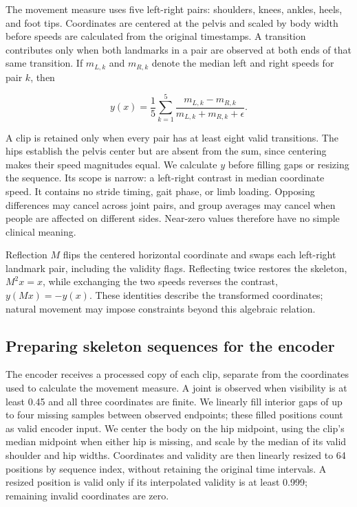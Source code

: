 \documentclass{article}
\begin{document}
The movement measure uses five left-right pairs: shoulders, knees, ankles, heels, and foot tips. Coordinates are centered at the pelvis and scaled by body width before speeds are calculated from the original timestamps. A transition contributes only when both landmarks in a pair are observed at both ends of that same transition. If \(m_{L,k}\) and \(m_{R,k}\) denote the median left and right speeds for pair \(k\), then

\[
y(x)=\frac{1}{5}\sum_{k=1}^{5}
\frac{m_{L,k}-m_{R,k}}{m_{L,k}+m_{R,k}+\epsilon}.
\]

A clip is retained only when every pair has at least eight valid transitions. The hips establish the pelvis center but are absent from the sum, since centering makes their speed magnitudes equal. We calculate \(y\) before filling gaps or resizing the sequence. Its scope is narrow: a left-right contrast in median coordinate speed. It contains no stride timing, gait phase, or limb loading. Opposing differences may cancel across joint pairs, and group averages may cancel when people are affected on different sides. Near-zero values therefore have no simple clinical meaning.

Reflection \(M\) flips the centered horizontal coordinate and swaps each left-right landmark pair, including the validity flags. Reflecting twice restores the skeleton, \(M^2x=x\), while exchanging the two speeds reverses the contrast, \(y(Mx)=-y(x)\). These identities describe the transformed coordinates; natural movement may impose constraints beyond this algebraic relation.

\subsection{Preparing skeleton sequences for the encoder}\label{preparing-skeleton-sequences-for-the-encoder}

The encoder receives a processed copy of each clip, separate from the coordinates used to calculate the movement measure. A joint is observed when visibility is at least 0.45 and all three coordinates are finite. We linearly fill interior gaps of up to four missing samples between observed endpoints; these filled positions count as valid encoder input. We center the body on the hip midpoint, using the clip's median midpoint when either hip is missing, and scale by the median of its valid shoulder and hip widths. Coordinates and validity are then linearly resized to 64 positions by sequence index, without retaining the original time intervals. A resized position is valid only if its interpolated validity is at least 0.999; remaining invalid coordinates are zero.
\end{document}
